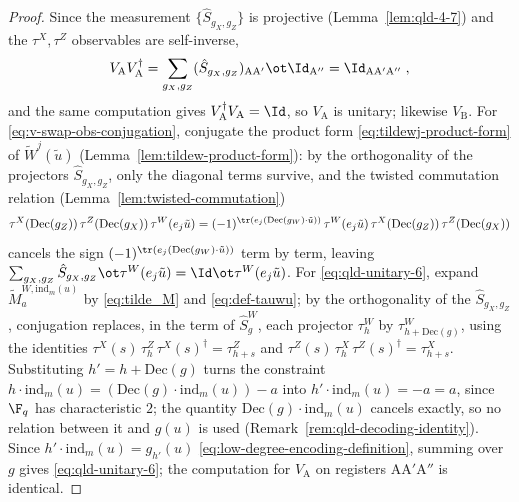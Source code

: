 \begin{proof}
	\leanok
	\leanok
	Since the measurement $\{\hat{S}_{g_X,g_Z}\}$ is projective (Lemma~\ref{lem:qld-4-7}) and the $\tau^X, \tau^Z$ observables are self-inverse,
	\[
		V_{\mathrm{A}} V_{\mathrm{A}}^\dagger = \sum_{g_X,g_Z} (\hat{S}_{g_X,g_Z})_{\mathrm{A}\mathrm{A}'} \ot \Id_{\mathrm{A}''} = \Id_{\mathrm{A}\mathrm{A}'\mathrm{A}''}\;,
	\]
	and the same computation gives $V_{\mathrm{A}}^\dagger V_{\mathrm{A}} = \Id$, so $V_{\mathrm{A}}$ is unitary; likewise $V_{\mathrm{B}}$. For \eqref{eq:v-swap-obs-conjugation}, conjugate the product form \eqref{eq:tildewj-product-form} of $\tilde{W}^j(\tilde{u})$ (Lemma~\ref{lem:tildew-product-form}): by the orthogonality of the projectors $\hat{S}_{g_X,g_Z}$, only the diagonal terms survive, and the twisted commutation relation (Lemma~\ref{lem:twisted-commutation})
	\[
		\tau^X(\mathrm{Dec}(g_Z)) \, \tau^Z(\mathrm{Dec}(g_X)) \, \tau^W(e_j \tilde{u}) = (-1)^{\tr( e_j(\mathrm{Dec}(g_W) \cdot \tilde{u}))} \, \tau^W(e_j \tilde{u}) \, \tau^X(\mathrm{Dec}(g_Z)) \, \tau^Z(\mathrm{Dec}(g_X))
	\]
	cancels the sign $(-1)^{\tr(e_j (\mathrm{Dec}(g_W) \cdot \tilde{u}))}$ term by term, leaving $\sum_{g_X,g_Z} \hat{S}_{g_X,g_Z} \ot \tau^W(e_j \tilde{u}) = \Id \ot \tau^W(e_j \tilde{u})$. For \eqref{eq:qld-unitary-6}, expand $\tilde{M}^{W,\mathrm{ind}_m(u)}_a$ by \eqref{eq:tilde_M} and \eqref{eq:def-tauwu}; by the orthogonality of the $\hat{S}_{g_X,g_Z}$, conjugation replaces, in the term of $\hat{S}^W_g$, each projector $\tau^W_h$ by $\tau^W_{h + \mathrm{Dec}(g)}$, using the identities $\tau^X(s)\, \tau^Z_h \,\tau^X(s)^\dagger = \tau^Z_{h+s}$ and $\tau^Z(s)\, \tau^X_h\, \tau^Z(s)^\dagger = \tau^X_{h+s}$. Substituting $h' = h + \mathrm{Dec}(g)$ turns the constraint $h \cdot \mathrm{ind}_m(u) = (\mathrm{Dec}(g) \cdot \mathrm{ind}_m(u)) - a$ into $h' \cdot \mathrm{ind}_m(u) = -a = a$, since $\F_q$ has characteristic $2$; the quantity $\mathrm{Dec}(g) \cdot \mathrm{ind}_m(u)$ cancels exactly, so no relation between it and $g(u)$ is used (Remark~\ref{rem:qld-decoding-identity}). Since $h' \cdot \mathrm{ind}_m(u) = g_{h'}(u)$ \eqref{eq:low-degree-encoding-definition}, summing over $g$ gives \eqref{eq:qld-unitary-6}; the computation for $V_{\mathrm{A}}$ on registers $\mathrm{A}\mathrm{A}'\mathrm{A}''$ is identical.
\end{proof}

